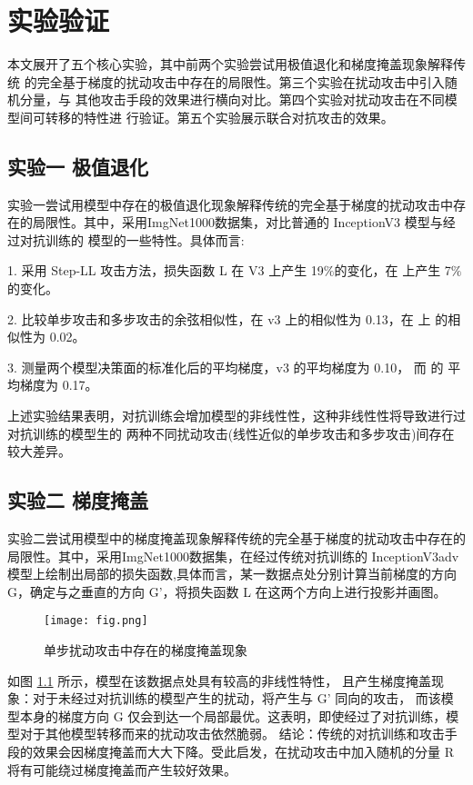 \chapter{实验验证}
本文展开了五个核心实验，其中前两个实验尝试用极值退化和梯度掩盖现象解释传统 的完全基于梯度的扰动攻击中存在的局限性。第三个实验在扰动攻击中引入随机分量，与 其他攻击手段的效果进行横向对比。第四个实验对扰动攻击在不同模型间可转移的特性进 行验证。第五个实验展示联合对抗攻击的效果。
\section{实验一 \; 极值退化}
实验一尝试用模型中存在的极值退化现象解释传统的完全基于梯度的扰动攻击中存在的局限性。其中，采用ImgNet1000数据集，对比普通的 InceptionV3 模型与经过对抗训练的  模型的一些特性。具体而言:

1. 采用 Step-LL 攻击方法，损失函数 L 在 V3 上产生 19$\%$的变化，在  上产生 7$\%$ 的变化。

2. 比较单步攻击和多步攻击的余弦相似性，在 v3 上的相似性为 0.13，在  上 的相似性为 0.02。

3. 测量两个模型决策面的标准化后的平均梯度，v3 的平均梯度为 0.10， 而 的 平均梯度为 0.17。


上述实验结果表明，对抗训练会增加模型的非线性性，这种非线性性将导致进行过对抗训练的模型生的 两种不同扰动攻击(线性近似的单步攻击和多步攻击)间存在较大差异。

\section{实验二 \; 梯度掩盖}

实验二尝试用模型中的梯度掩盖现象解释传统的完全基于梯度的扰动攻击中存在的局限性。其中，采用ImgNet1000数据集，在经过传统对抗训练的 InceptionV3adv 模型上绘制出局部的损失函数,具体而言，某一数据点处分别计算当前梯度的方向 G，确定与之垂直的方向 G’，将损失函数 L 在这两个方向上进行投影并画图。


\begin{figure}[htbp]
    \centering
    \texttt{[image: fig.png]}
    \caption{单步扰动攻击中存在的梯度掩盖现象}
    \label{fig:ss}
\end{figure}


如图 \ref{fig:ss} 所示，模型在该数据点处具有较高的非线性特性， 且产生梯度掩盖现象：对于未经过对抗训练的模型产生的扰动，将产生与 G' 同向的攻击， 而该模型本身的梯度方向 G 仅会到达一个局部最优。这表明，即使经过了对抗训练，模型对于其他模型转移而来的扰动攻击依然脆弱。 结论：传统的对抗训练和攻击手段的效果会因梯度掩盖而大大下降。受此启发，在扰动攻击中加入随机的分量 R 将有可能绕过梯度掩盖而产生较好效果。

